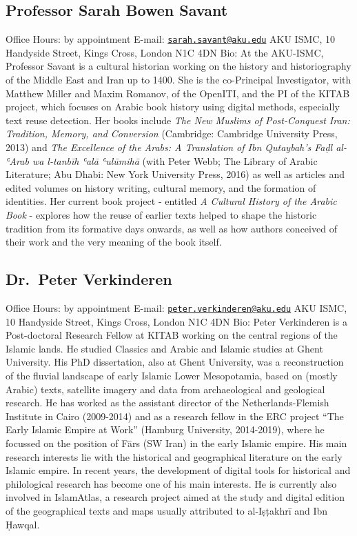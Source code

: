 \documentclass[
]{book}
\begin{document}
\hypertarget{professor-sarah-bowen-savant}{%
\subsection{Professor Sarah Bowen Savant}\label{professor-sarah-bowen-savant}}

Office Hours: by appointment
E-mail: \href{mailto:sarah.savant@aku.edu}{\nolinkurl{sarah.savant@aku.edu}}
AKU ISMC, 10 Handyside Street, Kings Cross, London N1C 4DN
Bio: At the AKU-ISMC, Professor Savant is a cultural historian working on the history and historiography of the Middle East and Iran up to 1400. She is the co-Principal Investigator, with Matthew Miller and Maxim Romanov, of the OpenITI, and the PI of the KITAB project, which focuses on Arabic book history using digital methods, especially text reuse detection. Her books include \emph{The New Muslims of Post-Conquest Iran: Tradition, Memory, and Conversion} (Cambridge: Cambridge University Press, 2013) and \emph{The Excellence of the Arabs: A Translation of Ibn Qutaybah's Faḍl al-ʿArab wa l-tanbīh ʿalā ʿulūmihā} (with Peter Webb; The Library of Arabic Literature; Abu Dhabi: New York University Press, 2016) as well as articles and edited volumes on history writing, cultural memory, and the formation of identities. Her current book project - entitled \emph{A Cultural History of the Arabic Book} - explores how the reuse of earlier texts helped to shape the historic tradition from its formative days onwards, as well as how authors conceived of their work and the very meaning of the book itself.

\hypertarget{dr.-peter-verkinderen}{%
\subsection{Dr.~Peter Verkinderen}\label{dr.-peter-verkinderen}}

Office Hours: by appointment
E-mail: \href{mailto:peter.verkinderen@aku.edu}{\nolinkurl{peter.verkinderen@aku.edu}}
AKU ISMC, 10 Handyside Street, Kings Cross, London N1C 4DN
Bio: Peter Verkinderen is a Post-doctoral Research Fellow at KITAB working on the central regions of the Islamic lands. He studied Classics and Arabic and Islamic studies at Ghent University. His PhD dissertation, also at Ghent University, was a reconstruction of the fluvial landscape of early Islamic Lower Mesopotamia, based on (mostly Arabic) texts, satellite imagery and data from archaeological and geological research. He has worked as the assistant director of the Netherlands-Flemish Institute in Cairo (2009-2014) and as a research fellow in the ERC project ``The Early Islamic Empire at Work'' (Hamburg University, 2014-2019), where he focussed on the position of Fārs (SW Iran) in the early Islamic empire. His main research interests lie with the historical and geographical literature on the early Islamic empire. In recent years, the development of digital tools for historical and philological research has become one of his main interests. He is currently also involved in IslamAtlas, a research project aimed at the study and digital edition of the geographical texts and maps usually attributed to al-Iṣṭakhrī and Ibn Ḥawqal.
\end{document}
